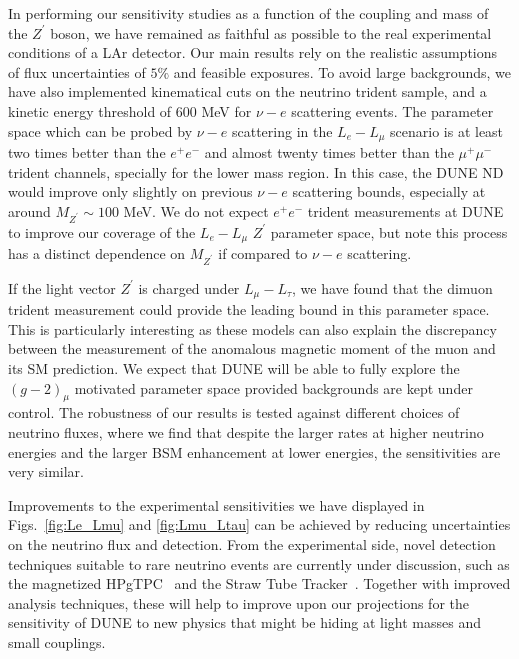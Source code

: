 In performing our sensitivity studies as a function of the coupling and mass of the $Z^\prime$ boson, we have remained as faithful as possible to the real experimental conditions of a LAr detector. Our main results rely on the realistic assumptions of flux uncertainties of $5\%$ and feasible exposures. To avoid large backgrounds, we have also implemented kinematical cuts on the neutrino trident sample, and a kinetic energy threshold of $600$ MeV for $\nu-e$ scattering events. The parameter space which can be probed by $\nu-e$ scattering in the $L_e-L_\mu$ scenario is at least two times better than the $e^+e^-$ and almost twenty times better than the $\mu^+\mu^-$ trident channels, specially for the lower mass region. In this case, the DUNE ND would improve only slightly on previous $\nu-e$ scattering bounds, especially at around $M_{Z^\prime}\sim100$ MeV. We do not expect $e^+e^-$ trident  measurements at DUNE to improve our coverage of the $L_e - L_\mu$ $Z^\prime$ parameter space, but note this process has a distinct dependence on $M_{Z^\prime}$ if compared to $\nu-e$ scattering. 

If the light vector $Z^\prime$ is charged under $L_\mu-L_\tau$, we have found that the dimuon trident measurement could provide the leading bound in this parameter space. This is particularly interesting as these models can also explain the discrepancy between the measurement of the anomalous magnetic moment of the muon and its SM prediction. We expect that DUNE will be able to fully explore the $(g-2)_\mu$ motivated parameter space provided backgrounds are kept under control. The robustness of our results is tested against different choices of neutrino fluxes, where we find that despite the larger rates at higher neutrino energies and the larger BSM enhancement at lower energies, the sensitivities are very similar. 

Improvements to the experimental sensitivities we have displayed in Figs.~\ref{fig:Le_Lmu} and \ref{fig:Lmu_Ltau} can be achieved by reducing uncertainties on the neutrino flux and detection. From the experimental side, novel detection techniques suitable to rare neutrino events are currently under discussion, such as the magnetized HPgTPC~\cite{DUNE:GArOption} and the Straw Tube Tracker~\cite{PettiTalk,Duyang:2018lpe}. Together with improved analysis techniques, these will help to improve upon our projections for the sensitivity of DUNE to new physics that might be hiding at light masses and small couplings.

